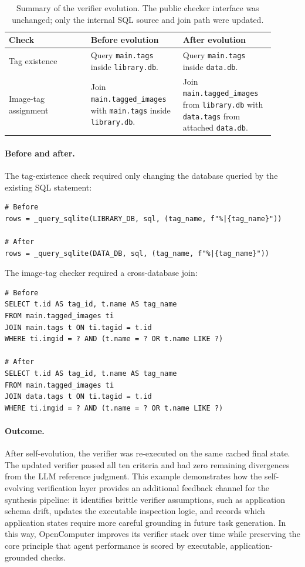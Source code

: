 \documentclass{llmxive}
\begin{document}
\begin{table}[!htbp]
\centering
\small
\begin{tabular}{p{0.28\linewidth}p{0.31\linewidth}p{0.31\linewidth}}
\toprule
Check & Before evolution & After evolution \\
\midrule
Tag existence &
Query \texttt{main.tags} inside \texttt{library.db}. &
Query \texttt{main.tags} inside \texttt{data.db}. \\
\addlinespace
Image-tag assignment &
Join \texttt{main.tagged\_images} with \texttt{main.tags} inside \texttt{library.db}. &
Join \texttt{main.tagged\_images} from \texttt{library.db} with \texttt{data.tags} from attached \texttt{data.db}. \\
\bottomrule
\end{tabular}
\label{tab:darktable-self-evolving-update}
\caption{
Summary of the verifier evolution. The public checker interface was unchanged;
only the internal SQL source and join path were updated.
}
\end{table}

\paragraph{Before and after.}
The tag-existence check required only changing the database queried by the
existing SQL statement:
\begin{verbatim}
# Before
rows = _query_sqlite(LIBRARY_DB, sql, (tag_name, f"%|{tag_name}"))

# After
rows = _query_sqlite(DATA_DB, sql, (tag_name, f"%|{tag_name}"))
\end{verbatim}

The image-tag checker required a cross-database join:
\begin{verbatim}
# Before
SELECT t.id AS tag_id, t.name AS tag_name
FROM main.tagged_images ti
JOIN main.tags t ON ti.tagid = t.id
WHERE ti.imgid = ? AND (t.name = ? OR t.name LIKE ?)

# After
SELECT t.id AS tag_id, t.name AS tag_name
FROM main.tagged_images ti
JOIN data.tags t ON ti.tagid = t.id
WHERE ti.imgid = ? AND (t.name = ? OR t.name LIKE ?)
\end{verbatim}

\paragraph{Outcome.}
After self-evolution, the verifier was re-executed on the same cached final
state. The updated verifier passed all ten criteria and had zero remaining
divergences from the LLM reference judgment. This example demonstrates how the
self-evolving verification layer provides an additional feedback channel for the
synthesis pipeline: it identifies brittle verifier assumptions, such as
application schema drift, updates the executable inspection logic, and records
which application states require more careful grounding in future task
generation. In this way, OpenComputer improves its verifier stack over time
while preserving the core principle that agent performance is scored by
executable, application-grounded checks.
\end{document}
